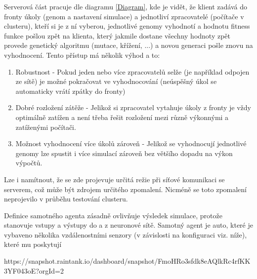 Serverová část pracuje dle diagramu \ref{Diagram}, kde je vidět, že klient zadává do fronty úkoly (genom a nastavení simulace) a jednotliví zpracovatelé (počítače v clusteru), kteří si je z ní vyberou, jednotlivé genomy vyhodnotí a hodnotu fitness funkce pošlou zpět na klienta, který jakmile dostane všechny hodnoty zpět provede genetický algoritmu (mutace, křížení, ...) a novou generaci pošle znovu na vyhodnocení.
Tento přístup má několik výhod a to:
\begin{enumerate}
	\item Robustnost - Pokud jeden nebo více zpracovatelů selže (je například odpojen ze sítě) je možné pokračovat ve vyhodnocování (neúspěšný úkol se automaticky vrátí zpátky do fronty)
	\item Dobré rozložení zátěže - Jelikož si zpracovatel vytahuje úkoly z fronty je vždy optimálně zatížen a není třeba řešit rozložení mezi různě výkonnými a zatíženými počítači.
	\item Možnost vyhodnocení více úkolů zároveň - Jelikož se vyhodnocují jednotlivé genomy lze spustit i více simulací zároveň bez většího dopadu na výkon výpočtů.
\end{enumerate}

Lze i namítnout, že se zde projevuje určitá režie při síťové komunikaci se serverem, což může být zdrojem určitého zpomalení. Nicméně se toto zpomalení neprojevilo v průběhu testování clusteru.


Definice samotného agenta zásadně ovlivňuje výsledek simulace, protože stanovuje vstupy a výstupy do a z neuronové sítě. 
Samotný agent je auto, které je vybaveno několika vzdálenostními senzory (v závislosti na konfiguraci viz. níže), které mu poskytují 

https://snapshot.raintank.io/dashboard/snapshot/FmoHRo3sfdk8eAQlkRc4rfKK3YF043oE?orgId=2